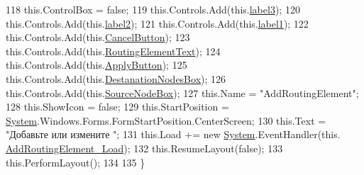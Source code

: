 \begin{DoxyCode}
118             this.ControlBox = \textcolor{keyword}{false};
119             this.Controls.Add(this.\hyperlink{class_desktop_network_analyzator_1_1_add_routing_element_a8ab52a205de9c87191fc4051b39787b3}{label3});
120             this.Controls.Add(this.\hyperlink{class_desktop_network_analyzator_1_1_add_routing_element_ac4aab0134a19193657cf3c881de0b987}{label2});
121             this.Controls.Add(this.\hyperlink{class_desktop_network_analyzator_1_1_add_routing_element_aae16b705a59cfe2759cd8cda798c0f20}{label1});
122             this.Controls.Add(this.\hyperlink{class_desktop_network_analyzator_1_1_add_routing_element_ab4cd9dc457b2beab02d78df432a55695}{CancelButton});
123             this.Controls.Add(this.\hyperlink{class_desktop_network_analyzator_1_1_add_routing_element_addd72bdde59da31d7c11eba45b4c4c56}{RoutingElementText});
124             this.Controls.Add(this.\hyperlink{class_desktop_network_analyzator_1_1_add_routing_element_a881e04900de8cb8d7e0734bd6d4ce5a9}{ApplyButton});
125             this.Controls.Add(this.\hyperlink{class_desktop_network_analyzator_1_1_add_routing_element_aa266b6496dbd1b1c37d33eac098c3367}{DestanationNodesBox});
126             this.Controls.Add(this.\hyperlink{class_desktop_network_analyzator_1_1_add_routing_element_a99e0f94879ded3763ca1efd408476f15}{SourceNodeBox});
127             this.Name = \textcolor{stringliteral}{"AddRoutingElement"};
128             this.ShowIcon = \textcolor{keyword}{false};
129             this.StartPosition = \hyperlink{namespace_system}{System}.Windows.Forms.FormStartPosition.CenterScreen;
130             this.Text = \textcolor{stringliteral}{"Добавьте или измените "};
131             this.Load += \textcolor{keyword}{new} \hyperlink{namespace_system}{System}.EventHandler(this.
      \hyperlink{class_desktop_network_analyzator_1_1_add_routing_element_ab3824e9c687867106312afbf8498dd91}{AddRoutingElement\_Load});
132             this.ResumeLayout(\textcolor{keyword}{false});
133             this.PerformLayout();
134 
135         \}
\end{DoxyCode}

